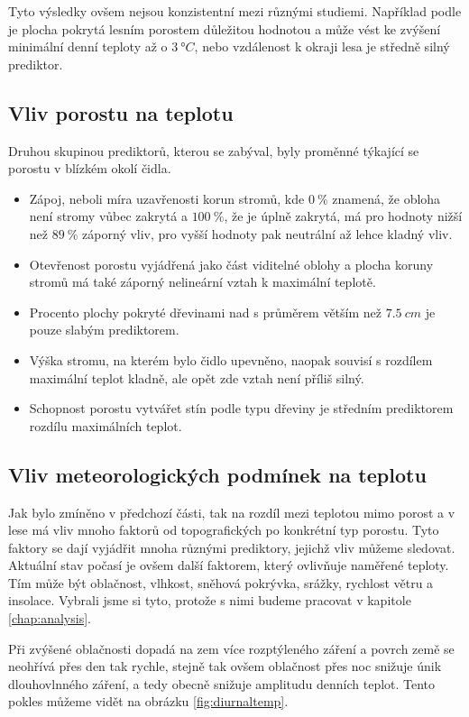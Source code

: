 Tyto výsledky ovšem nejsou konzistentní mezi různými studiemi. Například podle \cite{GreiserCaroline2018Mmmi} je plocha pokrytá lesním porostem důležitou hodnotou a může vést ke zvýšení minimální denní teploty až o $\SI{3}{\degree C}$, nebo vzdálenost k okraji lesa je středně silný prediktor.

\subsection{Vliv porostu na teplotu}
Druhou skupinou prediktorů, kterou se \cite{ZellwegerFlorian2019Sdou} zabýval, byly proměnné týkající se porostu v blízkém okolí čidla.

\begin{itemize}
	\item Zápoj, neboli míra uzavřenosti korun stromů, kde $\SI{0}{\%}$ znamená, že obloha není stromy vůbec zakrytá a $\SI{100}{\%}$, že je úplně zakrytá, má pro hodnoty nižší než $\SI{89}{\%}$ záporný vliv, pro vyšší hodnoty pak neutrální až lehce kladný vliv.
	\item Otevřenost porostu vyjádřená jako část viditelné oblohy a plocha koruny stromů má také záporný nelineární vztah k maximální teplotě.
	\item Procento plochy pokryté dřevinami nad s průměrem větším než $\SI{7.5}{cm}$ je pouze slabým prediktorem. 
	\item Výška stromu, na kterém bylo čidlo upevněno, naopak souvisí s rozdílem maximální teplot kladně, ale opět zde vztah není příliš silný.
	\item Schopnost porostu vytvářet stín podle typu dřeviny je středním prediktorem rozdílu maximálních teplot.
\end{itemize}

\subsection{Vliv meteorologických podmínek na teplotu}
Jak bylo zmíněno v předchozí části, tak na rozdíl mezi teplotou mimo porost a v lese má vliv mnoho faktorů od topografických po konkrétní typ porostu. Tyto faktory se dají vyjádřit mnoha různými prediktory, jejichž vliv můžeme sledovat. Aktuální stav počasí je ovšem další faktorem, který ovlivňuje naměřené teploty. Tím může být oblačnost, vlhkost, sněhová pokrývka, srážky, rychlost větru a insolace. Vybrali jsme si tyto, protože s nimi budeme pracovat v kapitole \ref{chap:analysis}.

Při zvýšené oblačnosti dopadá na zem více rozptýleného záření a povrch země se neohřívá přes den tak rychle, stejně tak ovšem oblačnost přes noc snižuje únik dlouhovlnného záření, a tedy obecně snižuje amplitudu denních teplot. Tento pokles můžeme vidět na obrázku \ref{fig:diurnaltemp}\cite{arya2001}.

